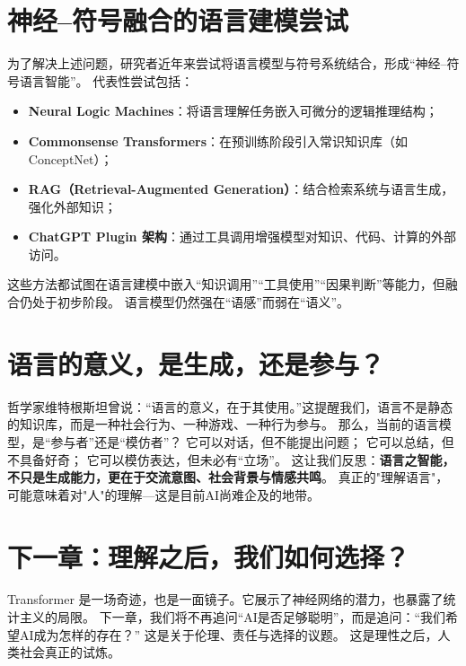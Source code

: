 \section*{神经–符号融合的语言建模尝试}
为了解决上述问题，研究者近年来尝试将语言模型与符号系统结合，形成“神经–符号语言智能”。
代表性尝试包括：
\begin{itemize}
\item \textbf{Neural Logic Machines}：将语言理解任务嵌入可微分的逻辑推理结构；
\item \textbf{Commonsense Transformers}：在预训练阶段引入常识知识库（如 ConceptNet）；
\item \textbf{RAG（Retrieval-Augmented Generation）}：结合检索系统与语言生成，强化外部知识；
\item \textbf{ChatGPT Plugin 架构}：通过工具调用增强模型对知识、代码、计算的外部访问。
\end{itemize}
这些方法都试图在语言建模中嵌入“知识调用”“工具使用”“因果判断”等能力，但融合仍处于初步阶段。
语言模型仍然强在“语感”而弱在“语义”。
\section*{语言的意义，是生成，还是参与？}
哲学家维特根斯坦曾说：“语言的意义，在于其使用。”这提醒我们，语言不是静态的知识库，而是一种社会行为、一种游戏、一种行为参与。
那么，当前的语言模型，是“参与者”还是“模仿者”？
它可以对话，但不能提出问题；
它可以总结，但不具备好奇；
它可以模仿表达，但未必有“立场”。
这让我们反思：\textbf{语言之智能，不只是生成能力，更在于交流意图、社会背景与情感共鸣}。
真正的"理解语言"，可能意味着对"人"的理解---这是目前AI尚难企及的地带。
\section*{下一章：理解之后，我们如何选择？}
Transformer 是一场奇迹，也是一面镜子。它展示了神经网络的潜力，也暴露了统计主义的局限。
下一章，我们将不再追问“AI是否足够聪明”，而是追问：“我们希望AI成为怎样的存在？”
这是关于伦理、责任与选择的议题。
这是理性之后，人类社会真正的试炼。
\nocite{*}
\printbibliography[heading=bibintoc, title=\ebibname]
\newpage

